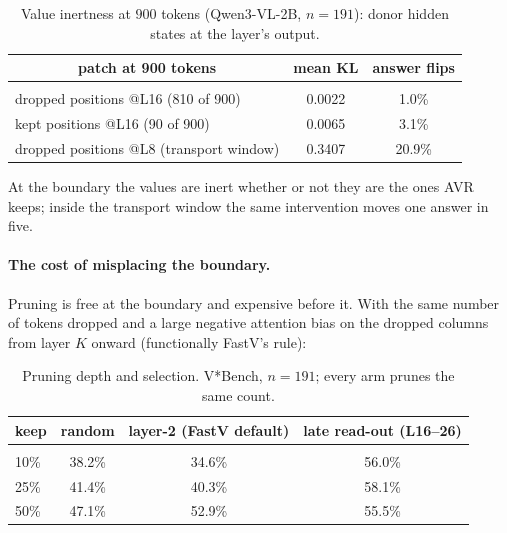 \begin{table}[t]
\caption{Value inertness at $900$ tokens (Qwen3-VL-2B, $n=191$): donor hidden states at the layer's output.}
\label{tab:inert900}
\begin{center}
\small
\begin{tabular}{lcc}
\multicolumn{1}{c}{\bf patch at 900 tokens} &\multicolumn{1}{c}{\bf mean KL} &\multicolumn{1}{c}{\bf answer flips}
\\ \hline \\
dropped positions @L16 (810 of 900) & 0.0022 & 1.0\%\\
kept positions @L16 (90 of 900) & 0.0065 & 3.1\%\\
dropped positions @L8 (transport window) & 0.3407 & 20.9\%\\
\end{tabular}
\end{center}
\end{table}

At the boundary the values are inert whether or not they are the ones AVR keeps; inside the transport window
the same intervention moves one answer in five.

\paragraph{The cost of misplacing the boundary.} Pruning is free at the boundary and expensive before it. With
the same number of tokens dropped and a large negative attention bias on the dropped columns from layer $K$
onward (functionally FastV's rule):

\begin{table}[t]
\caption{Pruning depth and selection. V*Bench, $n=191$; every arm prunes the same count.}
\label{tab:prunedepth}
\begin{center}
\small
\begin{tabular}{lccc}
\multicolumn{1}{c}{\bf keep} &\multicolumn{1}{c}{\bf random} &\multicolumn{1}{c}{\bf layer-2 (FastV default)} &\multicolumn{1}{c}{\bf late read-out (L16--26)}
\\ \hline \\
10\% & 38.2\% & 34.6\% & 56.0\%\\
25\% & 41.4\% & 40.3\% & 58.1\%\\
50\% & 47.1\% & 52.9\% & 55.5\%\\
\end{tabular}
\end{center}
\end{table}

